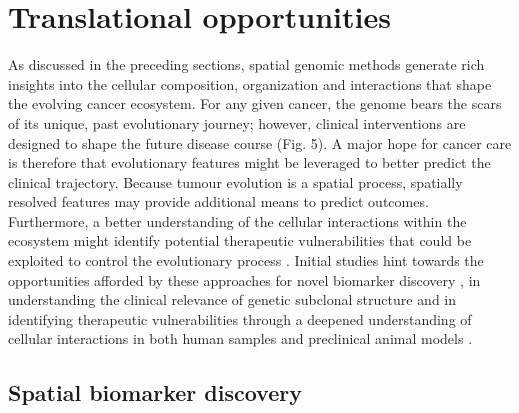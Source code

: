 \section{Translational opportunities}
As discussed in the preceding sections, spatial genomic methods generate rich insights into the cellular composition, organization and interactions that shape the evolving cancer ecosystem. For any given cancer, the genome bears the scars of its unique, past evolutionary journey; however, clinical interventions are designed to shape the future disease course (Fig. 5). A major hope for cancer care is therefore that evolutionary features might be leveraged to better predict the clinical trajectory. Because tumour evolution is a spatial process, spatially resolved features may provide additional means to predict outcomes. Furthermore, a better understanding of the cellular interactions within the ecosystem might identify potential therapeutic vulnerabilities that could be exploited to control the evolutionary process \parencite{Andersson2021-pu,Moncada2020-ck,Ji2020-gn,Van_Maldegem2021-ta,Moldoveanu2022-qu}. Initial studies hint towards the opportunities afforded by these approaches for novel biomarker discovery \parencite{Danenberg2022-zb,Keren2018-or, Moldoveanu2022-qu}, in understanding the clinical relevance of genetic subclonal structure \parencite{Zhao2022-xd,Lomakin2022-ks,Erickson2022-zh} and in identifying therapeutic vulnerabilities through a deepened understanding of cellular interactions in both human samples \parencite{Moncada2020-ck,Ji2020-gn,Keren2018-or} and preclinical animal models \parencite{Dhainaut2022-nj}.

\subsection*{Spatial biomarker discovery}

